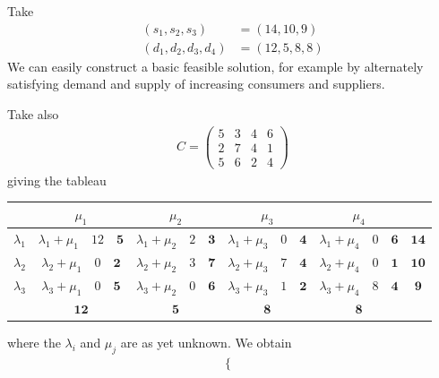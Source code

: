 \documentclass{../template/note}
\begin{document}
    \begin{example*}
        Take
        \begin{align*}
            (s_1, s_2, s_3) &= (14, 10, 9) \\
            (d_1, d_2, d_3, d_4) &= (12, 5, 8, 8)
        \end{align*}
        We can easily construct a basic feasible solution, for example by alternately satisfying demand and supply of increasing consumers and suppliers.

        Take also
        \begin{align*}
            C = \begin{pmatrix}
                5 & 3 & 4 & 6 \\
                2 & 7 & 4 & 1 \\
                5 & 6 & 2 & 4
            \end{pmatrix}
        \end{align*}
        giving the tableau
        \begin{center}    
            \begin{tabular}{| c | c c c c | c |}
                \hline
                & $\mu_1$ & $\mu_2$ & $\mu_3$ & $\mu_4$ &  \\
                \hline
                $\lambda_1$ & $\lambda_1 + \mu_1 \quad 12 \quad \mathbf{5}$ & $\lambda_1 + \mu_2 \quad 2 \quad \mathbf{3}$ & $\lambda_1 + \mu_3 \quad 0 \quad \mathbf{4}$ & $\lambda_1 + \mu_4 \quad 0 \quad \mathbf{6}$ & $\mathbf{14}$ \\
                $\lambda_2$ & $\lambda_2 + \mu_1 \quad 0 \quad \mathbf{2}$ & $\lambda_2 + \mu_2 \quad 3 \quad \mathbf{7}$ & $\lambda_2 + \mu_3 \quad 7 \quad \mathbf{4}$ & $\lambda_2 + \mu_4 \quad 0 \quad \mathbf{1}$ & $\mathbf{10}$ \\
                $\lambda_3$ & $\lambda_3 + \mu_1 \quad 0 \quad \mathbf{5}$ & $\lambda_3 + \mu_2 \quad 0 \quad \mathbf{6}$ & $\lambda_3 + \mu_3 \quad 1 \quad \mathbf{2}$ & $\lambda_3 + \mu_4 \quad 8 \quad \mathbf{4}$ & $\mathbf{9}$ \\
                \hline
                & $\mathbf{12}$ & $\mathbf{5}$ & $\mathbf{8}$ & $\mathbf{8}$ & \\
                \hline
            \end{tabular}        
        \end{center}   
        where the $\lambda_i$ and $\mu_j$ are as yet unknown. We obtain
        \begin{align*}
            \begin{cases}

\end{cases}
\end{align*}
\end{example*}
\end{document}
